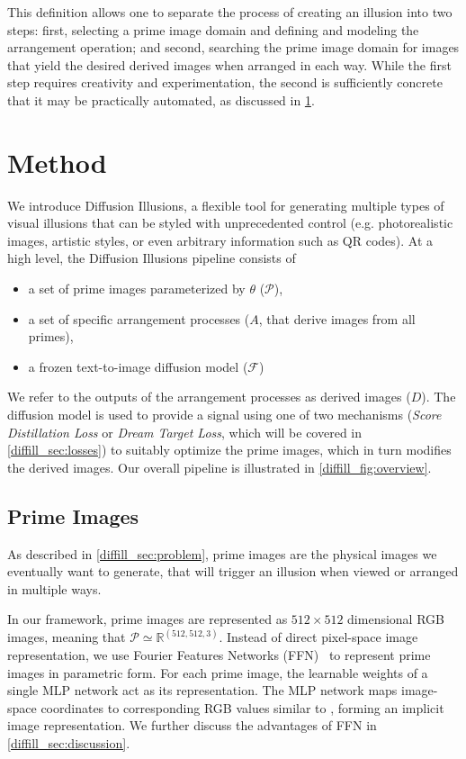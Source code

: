 This definition allows one to separate the process of creating an illusion into two steps: first, selecting a prime image domain and defining and modeling the arrangement operation; and second, searching the prime image domain for images that yield the desired derived images when arranged in each way. While the first step requires creativity and experimentation, the second is sufficiently concrete that it may be practically automated, as discussed in \cref{diffill_sec:method}.


\section{Method}
\label{diffill_sec:method}

We introduce Diffusion Illusions, a flexible tool for generating multiple types of visual illusions that can be styled with unprecedented control (e.g. photorealistic images, artistic styles, or even arbitrary information such as QR codes).
At a high level, the Diffusion Illusions pipeline consists of
\begin{itemize}[leftmargin=2em,noitemsep,topsep=0.0ex,itemsep=-1.0ex,partopsep=0ex,parsep=1ex]
    \item a set of prime images parameterized by $\theta$ ($\mathcal{P}$),
    \item a set of specific arrangement processes ($A$, that derive images from all primes),
    \item a frozen text-to-image diffusion model ($\mathcal{F}$)
\end{itemize}
We refer to the outputs of the arrangement processes as derived images ($D$).
The diffusion model is used to provide a signal using one of two mechanisms (\textit{Score Distillation Loss} or \textit{Dream Target Loss}, which will be covered in \cref{diffill_sec:losses}) to suitably optimize the prime images, which in turn modifies the derived images.
Our overall pipeline is illustrated in \cref{diffill_fig:overview}.

\subsection{Prime Images}
As described in \cref{diffill_sec:problem}, prime images are the physical images we eventually want to generate, that will trigger an illusion when viewed or arranged in multiple ways.

In our framework, prime images are represented as $512 \times 512$ dimensional RGB images, meaning that $\mathcal{P} \simeq \mathbb{R}^{(512,512,3)}$.
Instead of direct pixel-space image representation, we use Fourier Features Networks (FFN)~\cite{tancik2020fourier} to represent prime images in parametric form.
For each prime image, the learnable weights of a single MLP network act as its representation.
The MLP network maps image-space coordinates to corresponding RGB values similar to \cite{Burgert2022}, forming an implicit image representation.
We further discuss the advantages of FFN in \cref{diffill_sec:discussion}.

